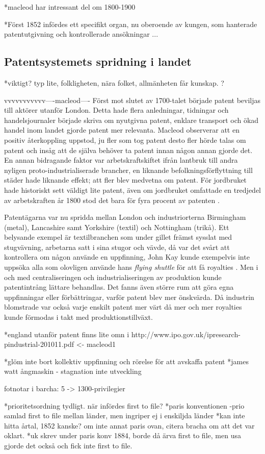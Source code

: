 *macleod har intressant del om 1800-1900



*Först 1852 infördes ett specifikt organ, nu oberoende av kungen, som hanterade patentutgivning och kontrollerade ansökningar ...



\subsection{Patentsystemets spridning i landet}
*viktigt? typ lite, folkligheten, nära folket, allmänheten får kunskap. ?

vvvvvvvvvvv----macleod----
Först mot slutet av 1700-talet började patent beviljas till aktörer utanför London. Detta hade flera
anledningar, tidningar och handelsjournaler började skriva om nyutgivna patent, enklare transport och
ökad handel inom landet gjorde patent mer relevanta\cite{macleod}. Macleod observerar att en positiv återkoppling uppstod, ju fler som tog
patent desto fler hörde talas om patent och insåg att de själva behöver ta patent innan någon annan gjorde
det. En annan bidragande faktor var arbetskraftskiftet ifrån lantbruk till andra nyligen
proto-industrialiserade brancher, en liknande befolkningsförflyttning till städer hade liknande effekt;
att fler blev medvetna om patent\cite{macleod}. För jordbruket hade historiskt sett väldigt lite patent, även om
jordbruket omfattade en tredjedel av arbetskraften år 1800 stod det bara för fyra procent av patenten
\cite{macleod2}.

Patentägarna var nu spridda mellan London och industriorterna Birmingham (metal), Lancashire samt
Yorkshire (textil) och Nottingham (trikå). Ett belysande exempel är textilbranchen som under gillet
främst sysslat med stugvävning, arbetarna satt i sina stugor och vävde, då var det svårt att
kontrollera om någon använde en uppfinning, John Kay kunde exempelvis inte uppsöka alla som olovligen
använde hans \emph{flying shuttle} för att få royalties \cite{macleod}. Men i och med centraliseringen och industrialiseringen av produktion kunde patentintrång lättare behandlas. Det fanns även större rum att göra
egna uppfinningar eller förbättringar, varför patent blev mer önskvärda. Då industrin blomstrade var
också varje enskilt patent mer värt då mer och mer royalties kunde förmodas i takt med
produktionstillväxt.


*england utanför patent finns lite omn i http://www.ipo.gov.uk/ipresearch-pindustrial-201011.pdf <- macleod1


*glöm inte bort kollektiv uppfinning och rörelse för att avskaffa patent 
*james watt ångmaskin - stagnation inte utveckling


fotnotar i barcha: 5 -> 1300-privilegier

*prioritetsordning tydligt. när infördes first to file?
*paris konventionen -prio samlad first to file mellan länder, men ingriper ej i enskiljda länder
*kan inte hitta årtal, 1852 kanske? om inte annat paris ovan, citera bracha om att det var oklart.
*uk skrev under paris konv 1884, borde då ärva first to file, men usa gjorde det också och fick inte first to file.


